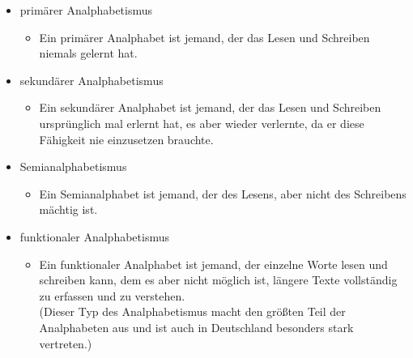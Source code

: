 \begin{itemize}
	\item primärer Analphabetismus
				\begin{itemize}
					  \item Ein primärer Analphabet ist jemand, der das Lesen und Schreiben niemals gelernt hat.
				\end{itemize}
	\item sekundärer Analphabetismus
				\begin{itemize}
					  \item Ein sekundärer Analphabet ist jemand, der das Lesen und Schreiben ursprünglich mal erlernt hat, es aber wieder verlernte, da er diese Fähigkeit nie einzusetzen brauchte.
				\end{itemize}
	\item Semianalphabetismus
				\begin{itemize}
					  \item Ein Semianalphabet ist jemand, der des Lesens, aber nicht des Schreibens mächtig ist.
				\end{itemize}
	\item funktionaler Analphabetismus
				\begin{itemize}
					  \item Ein funktionaler Analphabet ist jemand, der einzelne Worte lesen und schreiben kann, dem es aber nicht möglich ist, längere Texte vollständig zu erfassen und zu verstehen.\\
						(Dieser Typ des Analphabetismus macht den größten Teil der Analphabeten aus und ist auch in Deutschland besonders stark vertreten.)
				\end{itemize}
\end{itemize}